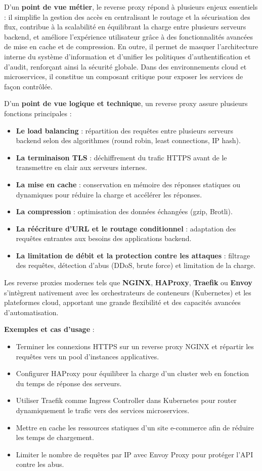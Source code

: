 D’un \textbf{point de vue métier}, le reverse proxy répond à plusieurs enjeux essentiels  : il simplifie la gestion des accès en centralisant le routage et la sécurisation des flux, contribue à la scalabilité en équilibrant la charge entre plusieurs serveurs backend, et améliore l’expérience utilisateur grâce à des fonctionnalités avancées de mise en cache et de compression. En outre, il permet de masquer l’architecture interne du système d’information et d’unifier les politiques d’authentification et d’audit, renforçant ainsi la sécurité globale. Dans des environnements cloud et microservices, il constitue un composant critique pour exposer les services de façon contrôlée.

D’un \textbf{point de vue logique et technique}, un reverse proxy assure plusieurs fonctions principales :
\begin{itemize}
	\item \textbf{Le load balancing}  : répartition des requêtes entre plusieurs serveurs backend selon des algorithmes (round robin, least connections, IP hash).
	\item \textbf{La terminaison TLS}  : déchiffrement du trafic HTTPS avant de le transmettre en clair aux serveurs internes.
	\item \textbf{La mise en cache}  : conservation en mémoire des réponses statiques ou dynamiques pour réduire la charge et accélérer les réponses.
	\item \textbf{La compression}  : optimisation des données échangées (gzip, Brotli).
	\item \textbf{La réécriture d’URL et le routage conditionnel}  : adaptation des requêtes entrantes aux besoins des applications backend.
	\item \textbf{La limitation de débit et la protection contre les attaques}  : filtrage des requêtes, détection d’abus (DDoS, brute force) et limitation de la charge.
\end{itemize}

Les reverse proxies modernes tels que \textbf{NGINX}, \textbf{HAProxy}, \textbf{Traefik} ou \textbf{Envoy} s’intègrent nativement avec les orchestrateurs de conteneurs (Kubernetes) et les plateformes cloud, apportant une grande flexibilité et des capacités avancées d’automatisation.

\textbf{Exemples et cas d’usage} :
\begin{itemize}
	\item Terminer les connexions HTTPS sur un reverse proxy NGINX et répartir les requêtes vers un pool d’instances applicatives.
	\item Configurer HAProxy pour équilibrer la charge d’un cluster web en fonction du temps de réponse des serveurs.
	\item Utiliser Traefik comme Ingress Controller dans Kubernetes pour router dynamiquement le trafic vers des services microservices.
	\item Mettre en cache les ressources statiques d’un site e-commerce afin de réduire les temps de chargement.
	\item Limiter le nombre de requêtes par IP avec Envoy Proxy pour protéger l’API contre les abus.
\end{itemize}

